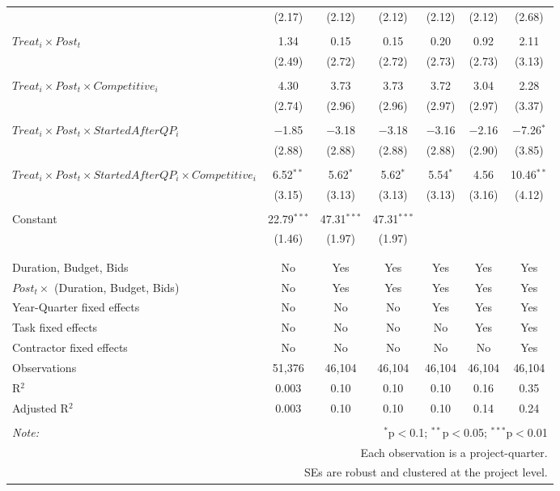 \documentclass[
]{article}
\begin{document}
\begin{table}[H]
\begin{tabular}{@{\extracolsep{-3pt}}lcccccc}
  & (2.17) & (2.12) & (2.12) & (2.12) & (2.12) & (2.68) \\ 
  & & & & & & \\ 
 $Treat_i \times Post_t$ & 1.34 & 0.15 & 0.15 & 0.20 & 0.92 & 2.11 \\ 
  & (2.49) & (2.72) & (2.72) & (2.73) & (2.73) & (3.13) \\ 
  & & & & & & \\ 
 $Treat_i \times Post_t \times Competitive_i$ & 4.30 & 3.73 & 3.73 & 3.72 & 3.04 & 2.28 \\ 
  & (2.74) & (2.96) & (2.96) & (2.97) & (2.97) & (3.37) \\ 
  & & & & & & \\ 
 $Treat_i \times Post_t \times StartedAfterQP_i$ & $-$1.85 & $-$3.18 & $-$3.18 & $-$3.16 & $-$2.16 & $-$7.26$^{*}$ \\ 
  & (2.88) & (2.88) & (2.88) & (2.88) & (2.90) & (3.85) \\ 
  & & & & & & \\ 
 $Treat_i \times Post_t \times StartedAfterQP_i \times Competitive_i$ & 6.52$^{**}$ & 5.62$^{*}$ & 5.62$^{*}$ & 5.54$^{*}$ & 4.56 & 10.46$^{**}$ \\ 
  & (3.15) & (3.13) & (3.13) & (3.13) & (3.16) & (4.12) \\ 
  & & & & & & \\ 
 Constant & 22.79$^{***}$ & 47.31$^{***}$ & 47.31$^{***}$ &  &  &  \\ 
  & (1.46) & (1.97) & (1.97) &  &  &  \\ 
  & & & & & & \\ 
\hline \\[-1.8ex] 
Duration, Budget, Bids & No & Yes & Yes & Yes & Yes & Yes \\ 
$Post_t \times $  (Duration, Budget, Bids) & No & Yes & Yes & Yes & Yes & Yes \\ 
Year-Quarter fixed effects & No & No & No & Yes & Yes & Yes \\ 
Task fixed effects & No & No & No & No & Yes & Yes \\ 
Contractor fixed effects & No & No & No & No & No & Yes \\ 
Observations & 51,376 & 46,104 & 46,104 & 46,104 & 46,104 & 46,104 \\ 
R$^{2}$ & 0.003 & 0.10 & 0.10 & 0.10 & 0.16 & 0.35 \\ 
Adjusted R$^{2}$ & 0.003 & 0.10 & 0.10 & 0.10 & 0.14 & 0.24 \\ 
\hline 
\hline \\[-1.8ex] 
\textit{Note:}  & \multicolumn{6}{r}{$^{*}$p$<$0.1; $^{**}$p$<$0.05; $^{***}$p$<$0.01} \\ 
 & \multicolumn{6}{r}{Each observation is a project-quarter.} \\ 
 & \multicolumn{6}{r}{SEs are robust and clustered at the project level.} \\ 
\end{tabular} 
\end{table}
\end{document}
